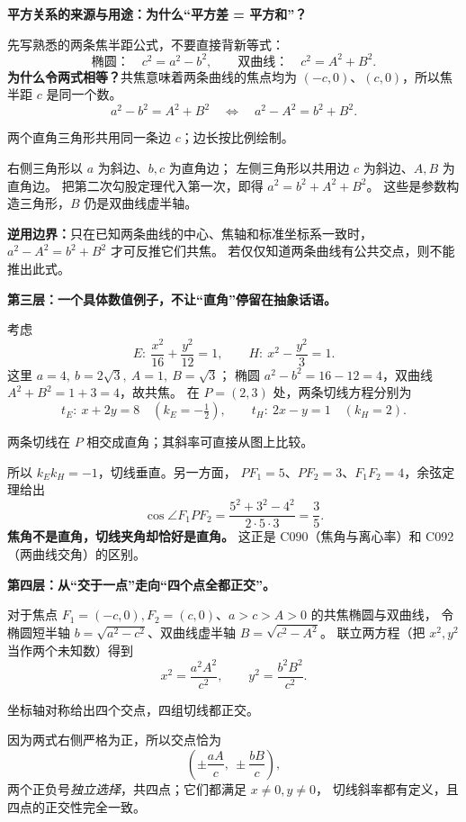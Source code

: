 \clearpage
\begin{explanationbox}
\textbf{平方关系的来源与用途：为什么“平方差 = 平方和”？}

先写熟悉的两条焦半距公式，不要直接背新等式：
\[
\text{椭圆：}\quad c^2=a^2-b^2,\qquad
\text{双曲线：}\quad c^2=A^2+B^2.
\]
\textbf{为什么令两式相等？}共焦意味着两条曲线的焦点均为
$(-c,0)$、$(c,0)$，所以焦半距 $c$ 是同一个数。
\[
 a^2-b^2=A^2+B^2
 \quad\Longleftrightarrow\quad
 \boxed{a^2-A^2=b^2+B^2}.
\]
\begin{center}


{\small 两个直角三角形共用同一条边 $c$；边长按比例绘制。}
\end{center}
右侧三角形以 $a$ 为斜边、$b,c$ 为直角边；
左侧三角形以共用边 $c$ 为斜边、$A,B$ 为直角边。
把第二次勾股定理代入第一次，即得 $a^2=b^2+A^2+B^2$。
这些是参数构造三角形，$B$ 仍是双曲线虚半轴。

\textbf{逆用边界：}只在已知两条曲线的中心、焦轴和标准坐标系一致时，
$ a^2-A^2=b^2+B^2$ 才可反推它们共焦。
若仅仅知道两条曲线有公共交点，则不能推出此式。
\end{explanationbox}

\clearpage
\begin{explanationbox}
\textbf{第三层：一个具体数值例子，不让“直角”停留在抽象话语。}

考虑
\[
E:\ \frac{x^2}{16}+\frac{y^2}{12}=1,\qquad
H:\ x^2-\frac{y^2}{3}=1.
\]
这里 $a=4,\ b=2\sqrt3,\ A=1,\ B=\sqrt3$；
椭圆 $a^2-b^2=16-12=4$，双曲线 $A^2+B^2=1+3=4$，故共焦。
在 $P=(2,3)$ 处，两条切线方程分别为
\[
t_E:\ x+2y=8\quad(k_E=-\tfrac12),\qquad
t_H:\ 2x-y=1\quad(k_H=2).
\]
\begin{center}


{\small 两条切线在 $P$ 相交成直角；其斜率可直接从图上比较。}
\end{center}
所以 $k_Ek_H=-1$，切线垂直。另一方面，
$PF_1=5$、$PF_2=3$、$F_1F_2=4$，余弦定理给出
\[
\cos\angle F_1PF_2=\frac{5^2+3^2-4^2}{2\cdot5\cdot3}=\frac35.
\]
\textbf{焦角不是直角，切线夹角却恰好是直角。}
这正是 C090（焦角与离心率）和 C092（两曲线交角）的区别。
\end{explanationbox}

\clearpage
\begin{explanationbox}
\textbf{第四层：从“交于一点”走向“四个点全都正交”。}

对于焦点 $F_1=(-c,0),F_2=(c,0)$、$a>c>A>0$ 的共焦椭圆与双曲线，
令椭圆短半轴 $b=\sqrt{a^2-c^2}$、双曲线虚半轴
$B=\sqrt{c^2-A^2}$。
联立两方程（把 $x^2,y^2$ 当作两个未知数）得到
\[
\boxed{x^2=\frac{a^2A^2}{c^2}},\qquad
\boxed{y^2=\frac{b^2B^2}{c^2}}.
\]
\begin{center}


{\small 坐标轴对称给出四个交点，四组切线都正交。}
\end{center}
因为两式右侧严格为正，所以交点恰为
\[
\left(\pm\frac{aA}{c},\ \pm\frac{bB}{c}\right),
\]
两个正负号\emph{独立选择}，共四点；它们都满足 $x\ne0,y\ne0$，
切线斜率都有定义，且四点的正交性完全一致。
\end{explanationbox}
